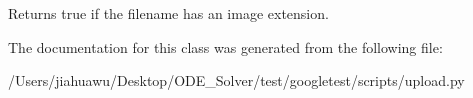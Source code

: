 \begin{DoxyVerb}Returns true if the filename has an image extension.\end{DoxyVerb}
 

The documentation for this class was generated from the following file\+:\begin{DoxyCompactItemize}
\item 
/\+Users/jiahuawu/\+Desktop/\+O\+D\+E\+\_\+\+Solver/test/googletest/scripts/upload.\+py\end{DoxyCompactItemize}
